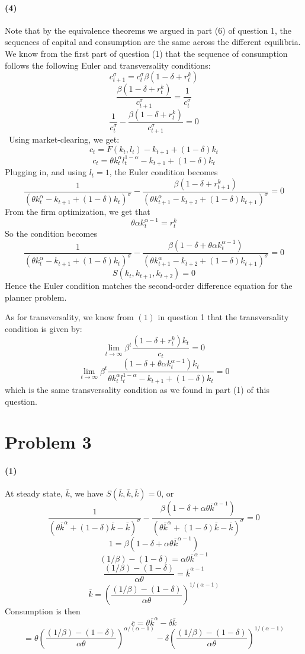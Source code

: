 \documentclass[10pt,letter]{article}
\newcommand{\problem}[1]{\section*{Problem #1}}
\newcommand{\problempart}[1]{\paragraph{#1}}
\begin{document}
\problempart{(4)}
Note that by the equivalence theorems we argued in part (6) of question 1, the sequences of capital and consumption are the same across the different equilibria. We know from the first part of question (1) that the sequence of consumption follows the following Euler and transversality conditions:
\[ c_{t+1}^\sigma = c_t^\sigma \beta (1-\delta + r^k_{t}) \]
\[ \frac{\beta(1-\delta + r^k_{t})}{c_{t+1}^\sigma} = \frac{1}{c_t^\sigma} \]
\[ \frac{1}{c_t^\sigma} - \frac{\beta(1-\delta + r^k_{t})}{c_{t+1}^\sigma} = 0 \]\
Using market-clearing, we get:
\[ c_t = F(k_t, l_t) - k_{t+1} + (1-\delta)k_t \]
\[ c_t = \theta k_t^\alpha l_t^{1-\alpha} - k_{t+1} + (1-\delta)k_t \]
Plugging in, and using $l_t = 1$, the Euler condition becomes
\[ \frac{1}{(\theta k_t^\alpha - k_{t+1} + (1-\delta)k_t)^\sigma} - \frac{\beta(1-\delta + r^k_{t+1})}{(\theta k_{t+1}^\alpha - k_{t+2} + (1-\delta)k_{t+1})^\sigma} = 0 \]
From the firm optimization, we get that
\[ \theta \alpha k_t^{\alpha - 1} = r^k_t \]
So the condition becomes
\[ \frac{1}{(\theta k_t^\alpha - k_{t+1} + (1-\delta)k_t)^\sigma} - \frac{\beta(1-\delta + \theta \alpha k_t^{\alpha - 1})}{(\theta k_{t+1}^\alpha - k_{t+2} + (1-\delta)k_{t+1})^\sigma} = 0 \]
\[ S(k_t, k_{t+1}, k_{t+2}) = 0 \]
Hence the Euler condition matches the second-order difference equation for the planner problem.

As for transversality, we know from $(1)$ in question 1 that the transversality condition is given by:
\[ \lim_{t \to \infty} \beta^t\frac{(1 - \delta + r^k_t) k_t}{c_t} = 0 \]
\[ \lim_{t \to \infty} \beta^t\frac{(1 - \delta + \theta \alpha k_t^{\alpha - 1}) k_t}{\theta k_t^\alpha l_t^{1-\alpha} - k_{t+1} + (1-\delta)k_t } = 0 \]
which is the same transversality condition as we found in part (1) of this question. 

\problem{3}
\problempart{(1)}
At steady state, $\bar{k}$, we have
$S(\bar{k}, \bar{k}, \bar{k}) = 0$, or
\[\frac{1}{(\theta \bar{k}^\alpha + (1-\delta)\bar{k} - \bar{k})^\sigma} - \frac{\beta(1-\delta + \alpha \theta \bar{k}^{\alpha - 1})}{(\theta \bar{k}^\alpha + (1-\delta)\bar{k} - \bar{k})^\sigma} = 0 \]
\[1 = \beta(1-\delta + \alpha \theta \bar{k}^{\alpha - 1}) \]
\[ (1/\beta) - (1-\delta) = \alpha \theta \bar{k}^{\alpha - 1} \]
\[ \frac{(1/\beta) - (1-\delta)}{\alpha \theta} = \bar{k}^{\alpha - 1} \]
\[ \bar{k} = \left(\frac{(1/\beta) - (1-\delta)}{\alpha \theta} \right)^{1/(\alpha - 1)} \]
Consumption is then
\[ \bar{c} = \theta \bar{k}^\alpha - \delta \bar{k}   \]
\[ = \theta \left(\frac{(1/\beta) - (1-\delta)}{\alpha \theta} \right)^{\alpha/(\alpha - 1)} - \delta \left(\frac{(1/\beta) - (1-\delta)}{\alpha \theta} \right)^{1/(\alpha - 1)} \]
\end{document}
